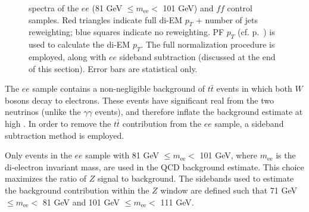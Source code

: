\documentclass[dissertation_bw.tex]{subfiles}
\begin{document}
\begin{figure}
	\hspace{1cm}
	\caption{\MET spectra of the $ee$ (81 GeV $\leq m_{\mathrm{ee}} <$ 101 GeV) and $\mathit{ff}$ control samples.  Red triangles indicate full di-EM $p_{T}$ + number of jets reweighting; blue squares indicate no reweighting.  PF $p_{T}$ (cf. p.~\pageref{fig:ET_bias_vs_EMF}) is used to calculate the di-EM $p_{T}$.  The full normalization procedure is employed, along with $ee$ sideband subtraction (discussed at the end of this section).  Error bars are statistical only.}
	\label{fig:reweighting_vs_no_reweighting}
\end{figure}

The $ee$ sample contains a non-negligible background of $t\bar{t}$ events in which both $W$ bosons decay to electrons.  These events have significant real \MET from the two neutrinos (unlike the $\gamma\gamma$ events), and therefore inflate the background estimate at high \MET.  In order to remove the $t\bar{t}$ contribution from the $ee$ sample, a sideband subtraction method is employed.

Only events in the $ee$ sample with 81 GeV $\leq m_{\mathrm{ee}} <$ 101 GeV, where $m_{\mathrm{ee}}$ is the di-electron invariant mass, are used in the QCD background estimate.  This choice maximizes the ratio of $Z$ signal to background.  The sidebands used to estimate the background contribution within the $Z$ window are defined such that 71 GeV $\leq m_{\mathrm{ee}} <$ 81 GeV and 101 GeV $\leq m_{\mathrm{ee}} <$ 111 GeV.
\end{document}
